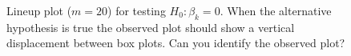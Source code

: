 \documentclass{article}
\begin{document}
\begin{figure}[hbt]
   \centering
       \caption{Lineup plot ($m=20$) for testing $H_0: \beta_k=0$. When the alternative hypothesis is true the observed plot should show a vertical displacement between box plots. Can you identify the observed plot?}
       \label{fig:test_category}
\end{figure}
\end{document}
